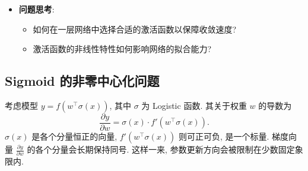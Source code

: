 \documentclass{../nndlcourse}
\begin{document}
\begin{itemize}
\begin{itemize}
\begin{itemize}
        \end{itemize}
        \item \textbf{复合激活函数}: 
        \begin{itemize}
            \item Swish 函数定义为
            \begin{equation*}
                \operatorname{swish}(x) = x\sigma(\beta x).
            \end{equation*}
            其中 $\sigma(\beta x)$ 可以理解为一个依赖输入的门控因子. 当 $\beta$ 增大时, 该门控更接近阶跃函数, Swish 也更接近 ReLU; 当 $\beta = 0$ 时, 它退化为线性缩放 $x/2$. 
            \item GELU 函数通常定义为
            \begin{equation*}
                \operatorname{GELU}(x) = x\Phi(x),
            \end{equation*}
            其中 $\Phi(x) = P(X \le x)$ 是标准高斯随机变量 $X \sim N(0, 1)$ 的分布函数. 它也可以看作一种输入相关的平滑门控机制. 
            \item 由于 $\Phi(x)$ 没有初等闭式表达, GELU 在实现中常使用近似式:
            \begin{align*}
                \operatorname{GELU}(x) &\approx 0.5x\left(1 + \tanh\left(\sqrt{\frac{2}{\pi}}\left(x + 0.044715x^3\right)\right)\right), \\
                \operatorname{GELU}(x) &\approx x\sigma(1.702x).
            \end{align*}
            \item Swish 和 GELU 都比传统分段线性函数更平滑, 目前在 Transformer 等模型中应用较多. 
        \end{itemize}
    \end{itemize}
    \item \textbf{问题思考}: 
    \begin{itemize}
        \item 如何在一层网络中选择合适的激活函数以保障收敛速度? 
        \item 激活函数的非线性特性如何影响网络的拟合能力? 
    \end{itemize}
\end{itemize}

\subsection{Sigmoid 的非零中心化问题}

考虑模型 $y = f( w^{\top} \sigma(x))$, 其中 $\sigma$ 为 Logistic 函数. 其关于权重 $w$ 的导数为
\begin{equation*}
    \frac{\partial y}{\partial w} = \sigma(x) \cdot f'(w^\top \sigma(x)).
\end{equation*}
$ \sigma(x) $ 是各个分量恒正的向量, $ f'(w^\top \sigma(x)) $ 则可正可负, 是一个标量. 梯度向量 $\frac{\partial y}{\partial w}$ 的各个分量会长期保持同号. 这样一来, 参数更新方向会被限制在少数固定象限内. 
\end{document}
